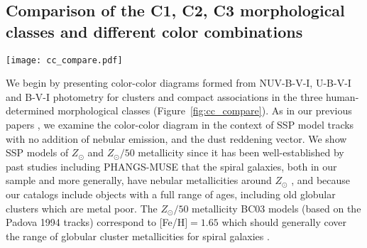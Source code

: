 \documentclass[]{aastex631}
\begin{document}
\subsection{Comparison of the C1, C2, C3 morphological classes and different color combinations}\label{ssect:cc_overview}
%
\begin{figure*} 
\texttt{[image: cc\_compare.pdf]}
 \caption{Color-color diagrams for the PHANGS-HST human classified sample, with each morphological class shown separately: C1 single-peaked symmetric clusters (left column); C2 single-peaked asymmetric clusters (middle column); and C3 multi-peaked compact associations (right column). In all panels V-I is plotted along the horizontal axis, and three other colors are shown along the vertical axis: NUV-B (top row), U-B (middle row) and B-V (bottom row).  We only show data points for clusters which are detected with at least a ${\rm S/N > 3}$ in the plotted bands. 
 Individual clusters are represented by black dots whereas in crowded regions we show a Gaussian-smoothed heat map indicating the relative density. 
 The size of the smoothing kernel is shown by a red circle on the top middle panel.
 A cyan track denotes the  SSP model for ${\rm Z_{\odot}}$ metallicity at ages from 1\,Myr till 13.7\,Gyr. The portion of the SSP track ${\rm Z_{\odot}/50}$ metallicity from 0.5-13.7\,Gyr is also shown with a magenta track. Key ages are indicated on the right column and are marked with blue and pink dots on each track.  A reddening vector (top right of each panel) corresponds to ${\rm A_v = 1.0 mag}$. In panel d), we indicate names for relevant loci in the color-color space.}
 \label{fig:cc_compare}
\end{figure*}
%
We begin by presenting color-color diagrams formed from NUV-B-V-I, U-B-V-I and B-V-I photometry for clusters and compact associations in the three human-determined morphological classes (Figure~\ref{fig:cc_compare}).  As in our previous papers \citep[e.g.,][]{turner_phangs-hst_2021,lee_phangs-hst_2022,deger_bright_2022}, we examine the color-color diagram in the context of   SSP model tracks with no addition of nebular emission, and the dust reddening vector.  We show SSP models of $Z_{\odot}$ and $Z_{\odot}/50$ metallicity since it has been well-established by past studies including PHANGS-MUSE that the spiral galaxies, both in our sample and more generally, have nebular metallicities around $Z_{\odot}$ \citep[e.g.,][]{zkh94, skillman_virgo_96, moustakas10, groves_phangs-muse_2023, scheuermann_stellar_2023}, and because our catalogs include objects with a full range of ages, including old globular clusters which are metal poor. The $Z_{\odot}/50$ metallicity BC03 models (based on the Padova 1994 tracks) correspond to $[$Fe/H$]=1.65$ which should generally cover the range of globular cluster metallicities for spiral galaxies \citep[][and references therein]{BS06}. 
\end{document}
